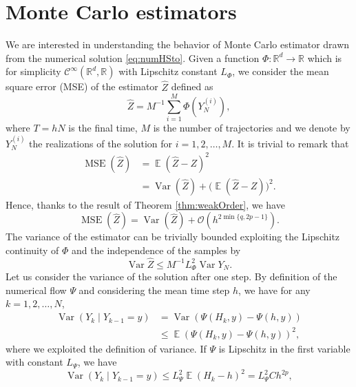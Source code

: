 \documentclass{siamart1116}
\numberwithin{theorem}{section}
\newcommand{\R}{\mathbb{R}}
\newcommand{\OO}{\mathcal{O}}
\newcommand{\Var}{\operatorname{Var}}
\newcommand{\E}{\operatorname{\mathbb{E}}}
\newcommand{\MSE}{\operatorname{MSE}}
\newcommand{\sksum}{\textstyle\sum}
\begin{document}
\section{Monte Carlo estimators}
We are interested in understanding the behavior of Monte Carlo estimator drawn from the numerical solution \eqref{eq:numHSto}. Given a function $\Phi\colon\R^d\to\R$ which is for simplicity $\mathcal{C}^\infty(\R^d, \R)$ with Lipschitz constant $L_\Phi$, we consider the mean square error (MSE) of the estimator $\hat Z$ defined as
\begin{equation}
	\hat Z = M^{-1} \sksum_{i = 1}^M \Phi(Y_N^{(i)}),
\end{equation}
where $T = hN$ is the final time, $M$ is the number of trajectories and we denote by $Y_N^{(i)}$ the realizations of the solution for $i = 1, 2, \ldots, M$. It is trivial to remark that 
\begin{equation}
\begin{aligned}
	\MSE(\hat Z) &= \E(\hat Z - Z)^2\\
	&= \Var(\hat Z) + \big(\E(\hat Z - Z)\big)^2.
\end{aligned}
\end{equation}
Hence, thanks to the result of Theorem \ref{thm:weakOrder}, we have
\begin{equation}\label{eq:MSEDecomposition}
	\MSE(\hat Z) = \Var(\hat Z) + \OO(h^{2\min\{q, 2p - 1\}}).
\end{equation}
The variance of the estimator can be trivially bounded exploiting the Lipschitz continuity of $\Phi$ and the independence of the samples by
\begin{equation}\label{eq:MSELipschitz}
	\Var\hat Z \leq M^{-1} L_\Phi^2 \Var Y_N.
\end{equation}
Let us consider the variance of the solution after one step. By definition of the numerical flow $\Psi$ and considering the mean time step $h$, we have for any $k = 1, 2, \ldots, N$,
\begin{equation}
\begin{aligned}
	\Var(Y_k \mid Y_{k-1} = y) &= \Var(\Psi(H_k, y) - \Psi(h, y))\\
	&\leq \E(\Psi(H_k, y) - \Psi(h, y))^2,
\end{aligned}
\end{equation}
where we exploited the definition of variance. If $\Psi$ is Lipschitz in the first variable with constant $L_\Psi$, we have
\begin{equation}\label{eq:VarianceOneStep}
	\Var (Y_k \mid Y_{k-1} = y) \leq L_\Psi^2\E(H_k - h)^2 = L_\Psi^2 C h^{2p},
\end{equation}
\end{document}
